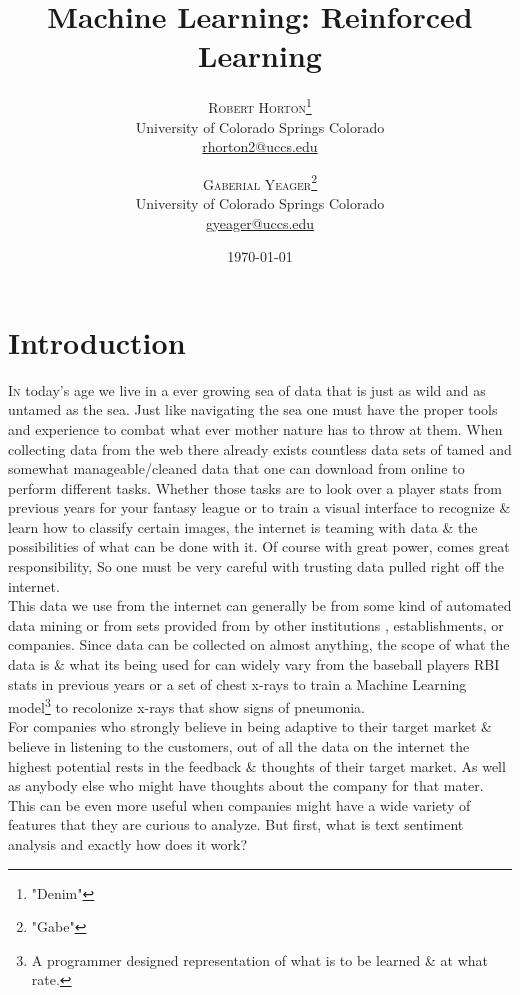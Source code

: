 \documentclass[twoside,twocolumn]{article}
\title{Machine Learning: Reinforced Learning} %
\author{%
\textsc{Robert Horton}\thanks{"Denim"} \\[1ex] %
\normalsize University of Colorado Springs Colorado \\ %
\normalsize \href{mailto:rhorton2@uccs.edu}{rhorton2@uccs.edu} %
\and %
\textsc{Gaberial Yeager}\thanks{"Gabe"} \\[1ex] %
\normalsize University of Colorado Springs Colorado \\ %
\normalsize \href{mailto:gyeager@uccs.edu}{gyeager@uccs.edu} %
}
\date{\today} %
\begin{document}
\maketitle


\section{Introduction}

\lettrine[nindent=0em,lines=3]{I}n today's age we live in a ever growing sea of data that is just as wild and as untamed as the sea.  Just like navigating the sea one must have the proper tools and experience to combat what ever mother nature has to throw at them.  When collecting data from the web there already exists countless  data sets of tamed and somewhat manageable/cleaned data that one can download from online to perform different tasks.  Whether those tasks are to look over a player stats from previous years for your fantasy league or to train a visual interface to recognize \& learn how to classify certain images, the internet is teaming with data \& the possibilities of what can be done with it.  Of course with great power, comes great responsibility, So one must be very careful with trusting data pulled right off the internet. \\ 
\indent This data we use from the internet can generally be from some kind of automated data mining or from sets provided from by other institutions , establishments, or companies.  Since data can be collected on almost anything, the scope of what the data is \& what its being used for can widely vary from the baseball players RBI stats in previous years or a set of chest x-rays to train a Machine Learning model\footnote{A programmer designed representation of what is to be learned \& at what rate.} to recolonize x-rays that show signs of pneumonia.\\
\indent For companies who strongly believe in being adaptive to their target market \& believe in listening to the customers, out of all the data on the internet the highest potential rests in the feedback \& thoughts of their target market. As well as anybody else who might have thoughts about the company for that mater.  This can be even more useful when companies might have a wide variety of features that they are curious to analyze. But first, what is text sentiment analysis and exactly how does it work? 
\end{document}
